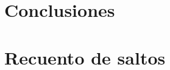 \documentclass{tfg_domingo}
\begin{document}
\lipsum[45]

\chapter{Conclusiones}

\lipsum[46-52]

\appendix
\chapter{Recuento de saltos}

\lipsum[1-24]

\backmatter

\end{document}
